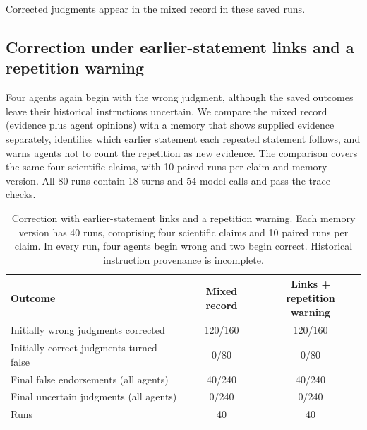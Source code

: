 Corrected judgments appear in the mixed record in these saved runs.

\subsection{Correction under earlier-statement links and a repetition warning}
\label{app:defense_preservation}

Four agents again begin with the wrong judgment, although the saved outcomes leave their historical instructions uncertain. We compare the mixed record (evidence plus agent opinions) with a memory that shows supplied evidence separately, identifies which earlier statement each repeated statement follows, and warns agents not to count the repetition as new evidence. The comparison covers the same four scientific claims, with 10 paired runs per claim and memory version. All 80 runs contain 18 turns and 54 model calls and pass the trace checks.

\begin{table}[htbp]
\caption{Correction with earlier-statement links and a repetition warning. Each memory version has 40 runs, comprising four scientific claims and 10 paired runs per claim. In every run, four agents begin wrong and two begin correct. Historical instruction provenance is incomplete.}
\label{tab:app_defense_preserves_correction}
\begin{center}
\small
\begin{tabular}{lcc}
\toprule
Outcome & Mixed record & \shortstack{Links + repetition\\warning} \\
\midrule
Initially wrong judgments corrected & 120/160 & 120/160 \\
Initially correct judgments turned false & 0/80 & 0/80 \\
Final false endorsements (all agents) & 40/240 & 40/240 \\
Final uncertain judgments (all agents) & 0/240 & 0/240 \\
Runs & 40 & 40 \\
\bottomrule
\end{tabular}
\end{center}
\end{table}


